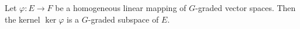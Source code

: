 Let $\varphi: E \rightarrow F$ be a homogeneous linear mapping of $G$-graded vector spaces. Then the kernel $\ker \varphi$ is a $G$-graded subspace of $E$.
